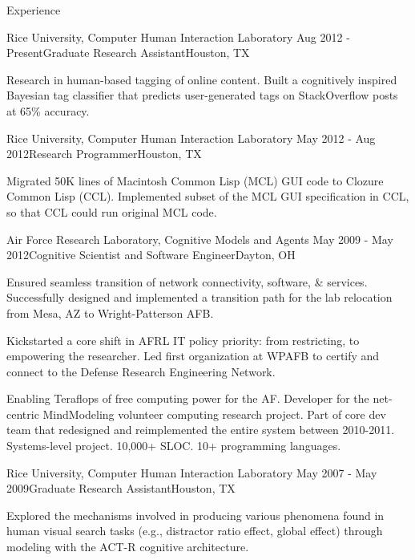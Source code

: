 
\begin{rSection}{Experience}

  \begin{rSubsection}{Rice University, Computer Human Interaction Laboratory}
    {Aug 2012 - Present}{Graduate Research Assistant}{Houston, TX}
  \item Research in human-based tagging of online content.
    Built a cognitively inspired Bayesian tag classifier that predicts user-generated tags on StackOverflow posts at 65\% accuracy.
  \end{rSubsection}

  \begin{rSubsection}{Rice University, Computer Human Interaction Laboratory}
    {May 2012 - Aug 2012}{Research Programmer}{Houston, TX}
  \item Migrated 50K lines of Macintosh Common Lisp (MCL) GUI code to Clozure Common Lisp (CCL).
    Implemented subset of the MCL GUI specification in CCL, so that CCL could run original MCL code.
  \end{rSubsection}

  \begin{rSubsection}{Air Force Research Laboratory, Cognitive Models and Agents}
    {May 2009 - May 2012}{Cognitive Scientist and Software Engineer}{Dayton, OH}
  \item
    Ensured seamless transition of network connectivity, software, \& services.
    Successfully designed and implemented a transition path for the lab relocation from Mesa, AZ to Wright-Patterson AFB. 
  \item 
    Kickstarted a core shift in AFRL IT policy priority: from restricting, to empowering the researcher.
    Led first organization at WPAFB to certify and connect to the Defense Research Engineering Network.
  \item 
    Enabling Teraflops of free computing power for the AF.
    Developer for the net-centric MindModeling volunteer computing research project.
    Part of core dev team that redesigned and reimplemented the entire system between 2010-2011.
    Systems-level project. 10,000+ SLOC. 10+ programming languages. 
  \end{rSubsection}

  \begin{rSubsection}{Rice University, Computer Human Interaction Laboratory}
    {May 2007 - May 2009}{Graduate Research Assistant}{Houston, TX}
  \item Explored the mechanisms involved in producing various phenomena found in human visual search tasks
    (e.g., distractor ratio effect, global effect) through modeling with the ACT-R cognitive architecture. 
  \end{rSubsection}


\end{rSection}
